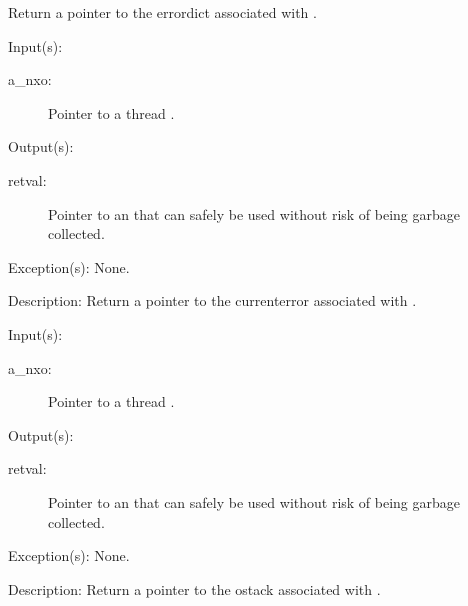 \begin{capi}
\begin{capilist}
		Return a pointer to the errordict associated with .
	\end{capilist}
\label{nxo_thread_currenterror_get}
	\begin{capilist}
	\item[Input(s): ]
		\begin{description}\item[]
		\item[a\_nxo: ]
			Pointer to a thread .
		\end{description}
	\item[Output(s): ]
		\begin{description}\item[]
		\item[retval: ]
			Pointer to an  that can safely be used
			without risk of being garbage collected.
		\end{description}
	\item[Exception(s): ] None.
	\item[Description: ]
		Return a pointer to the currenterror associated with
		.
	\end{capilist}
\label{nxo_thread_ostack_get}
	\begin{capilist}
	\item[Input(s): ]
		\begin{description}\item[]
		\item[a\_nxo: ]
			Pointer to a thread \classname{nxo}.
		\end{description}
	\item[Output(s): ]
		\begin{description}\item[]
		\item[retval: ]
			Pointer to an  that can safely be used
			without risk of being garbage collected.
		\end{description}
	\item[Exception(s): ] None.
	\item[Description: ]
		Return a pointer to the ostack associated with \cvar{a\_nxo}.
	\end{capilist}
\label{nxo_thread_dstack_get}

\end{capi}

